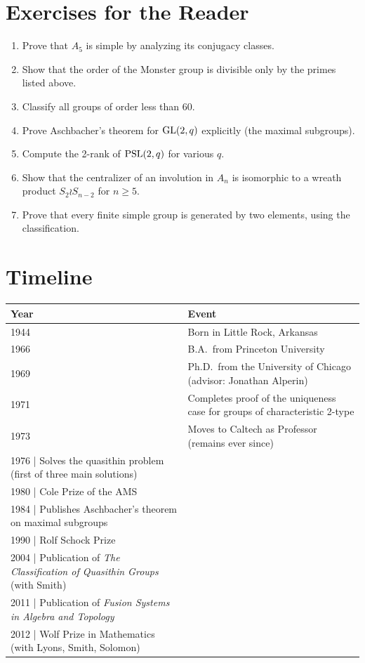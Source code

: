 \section*{Exercises for the Reader}

\begin{enumerate}
    \item [B] Prove that $A_5$ is simple by analyzing its conjugacy classes.
    \item [I] Show that the order of the Monster group is divisible only by the primes listed above.
    \item [B] Classify all groups of order less than 60.
    \item [A] Prove Aschbacher's theorem for $\operatorname{GL}(2,q)$ explicitly (the maximal subgroups).
    \item [I] Compute the 2-rank of $\operatorname{PSL}(2,q)$ for various $q$.
    \item [I] Show that the centralizer of an involution in $A_n$ is isomorphic to a wreath product $S_2 \wr S_{n-2}$ for $n \geq 5$.
    \item [A] Prove that every finite simple group is generated by two elements, using the classification.
\end{enumerate}

\section*{Timeline}

\begin{tabularx}{\linewidth}{|p{1.5cm}|>{\raggedright\arraybackslash}X|}
\hline
\textbf{Year} & \textbf{Event} \\ \hline
1944 & Born in Little Rock, Arkansas \\ \hline
1966 & B.A.\ from Princeton University \\ \hline
1969 & Ph.D.\ from the University of Chicago (advisor: Jonathan Alperin) \\ \hline
1971 & Completes proof of the uniqueness case for groups of characteristic 2-type \\ \hline
1973 & Moves to Caltech as Professor (remains ever since) \\ \hline
1976 | Solves the quasithin problem (first of three main solutions) \\ \hline
1980 | Cole Prize of the AMS \\ \hline
1984 | Publishes Aschbacher's theorem on maximal subgroups \\ \hline
1990 | Rolf Schock Prize \\ \hline
2004 | Publication of \textit{The Classification of Quasithin Groups} (with Smith) \\ \hline
2011 | Publication of \textit{Fusion Systems in Algebra and Topology} \\ \hline
2012 | Wolf Prize in Mathematics (with Lyons, Smith, Solomon) \\ \hline
\end{tabularx}

